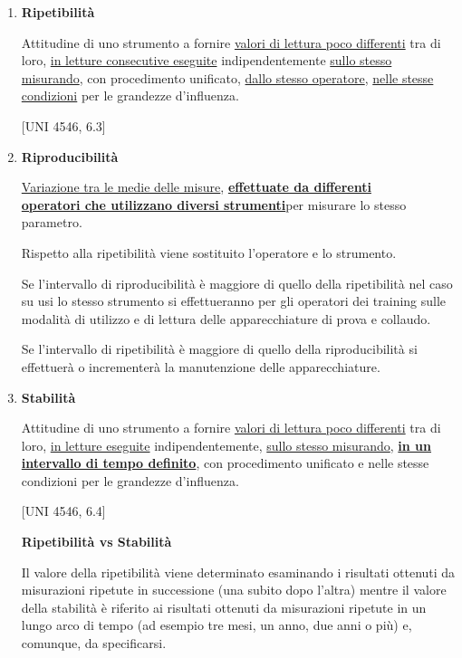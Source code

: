 \documentclass[a4paper, 15pt]{article}
\begin{document}
\begin{adjustwidth}{2in}{}
\begin{enumerate}
\item \textbf{Ripetibilità} 

	Attitudine di uno strumento a fornire \underline{valori di lettura poco differenti} tra di loro,
	\underline{in letture consecutive eseguite} indipendentemente \underline{sullo stesso misurando},
	con procedimento unificato, \underline{dallo stesso operatore}, \underline{nelle stesse condizioni}
	per le grandezze d'influenza.
	
	[UNI 4546, 6.3]
	
\item \textbf{Riproducibilità} 

	\underline{Variazione tra le medie delle misure}, \underline{\textbf{effettuate da differenti}} \\ \underline{\textbf{operatori che
	utilizzano diversi strumenti}}per misurare lo stesso parametro. \newline 

	Rispetto alla ripetibilità viene sostituito l'operatore e lo strumento. \newline 
	
	Se l'intervallo di riproducibilità è maggiore di quello della ripetibilità nel caso su usi lo
	stesso strumento si effettueranno per gli operatori dei training sulle modalità di utilizzo e di lettura
	delle apparecchiature di prova e collaudo. \newline
	
	Se l'intervallo di ripetibilità è maggiore di quello della riproducibilità si effettuerà o
	incrementerà la manutenzione delle apparecchiature. 
	
\item \textbf{Stabilità} 

	Attitudine di uno strumento a fornire \underline{valori di lettura poco differenti} tra di loro,
	\underline{in letture eseguite} indipendentemente, \underline{sullo stesso misurando}, \underline{\textbf{in un intervallo
	di tempo definito}}, con procedimento unificato e nelle stesse condizioni per le
	grandezze d'influenza.
	
	[UNI 4546, 6.4]
	
	\newpage 
	
	\textbf{Ripetibilità vs Stabilità} 
	
	Il valore della ripetibilità viene determinato esaminando i risultati ottenuti da
	misurazioni ripetute in successione (una subito dopo l'altra) mentre il valore della stabilità è riferito ai risultati ottenuti da misurazioni ripetute in un
	lungo arco di tempo (ad esempio tre mesi, un anno, due anni o più) e,
	comunque, da specificarsi.
	

\end{enumerate}
\end{adjustwidth}
\end{document}
